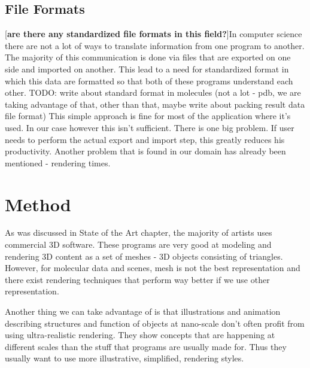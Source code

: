 \documentclass[
  digital, %
  table,   %
  nolof,     %
  nolot,     %
]{fithesis3}
\begin{document}
\section{File Formats}

[\textbf{are there any standardized file formats in this field?}]In computer science there are not a lot of ways to translate information from one program to another. The majority of this communication is done via files that are exported on one side and imported on another. This lead to a need for standardized format in which this data are formatted so that both of these programs understand each other. TODO: write about standard format in molecules (not a lot - pdb, we are taking advantage of that, other than that, maybe write about packing result data file format) This simple approach is fine for most of the application where it's used. In our case however this isn't sufficient. There is one big problem. If user needs to perform the actual export and import step, this greatly reduces his productivity. Another problem that is found in our domain has already been mentioned - rendering times.

\chapter{Method}

As was discussed in State of the Art chapter, the majority of artists uses commercial 3D software. These programs are very good at modeling and rendering 3D content as a set of meshes - 3D objects consisting of triangles. However, for molecular data and scenes, mesh is not the best representation and there exist rendering techniques that perform way better if we use other representation.

Another thing we can take advantage of is that illustrations and animation describing structures and function of objects at nano-scale don't often profit from using ultra-realistic rendering. They show concepts that are happening at different scales than the stuff that programs are usually made for. Thus they usually want to use more illustrative, simplified, rendering styles.
\end{document}
